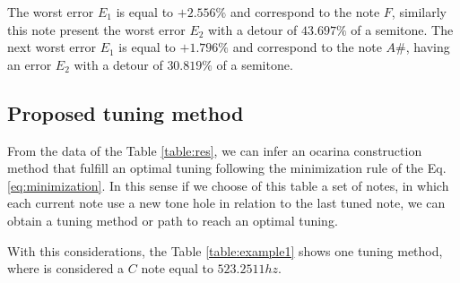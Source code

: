 \documentclass[11pt,twocolumn]{article}
\begin{document}
The worst error $E_1$ is equal to $+2.556\%$ and correspond to the note $F$,
similarly this note present the worst error $E_2$ with a detour of $43.697\%$ of a semitone.
The next worst error $E_1$ is equal to $+1.796\%$ and correspond to the note $A\#$,
having an error $E_2$ with a detour of $30.819\%$ of a semitone.


\subsection{Proposed tuning method}
From the data of the Table \ref{table:res}, 
we can infer an ocarina construction method that fulfill 
an optimal tuning following the minimization rule of the Eq. \ref{eq:minimization}.
In this sense if we choose of this table a set of notes, 
in which each current note use a new tone hole in relation to the last tuned note, 
we can obtain a tuning method or path to reach an optimal tuning.

With this considerations, the Table \ref{table:example1} shows one tuning method,
where is considered a $C$ note equal to $523.2511 hz$.

\begin{table}[h]
\center
{}
\caption{Proposed tuning method.}
\label{table:example1}
\end{table}
\end{document}
